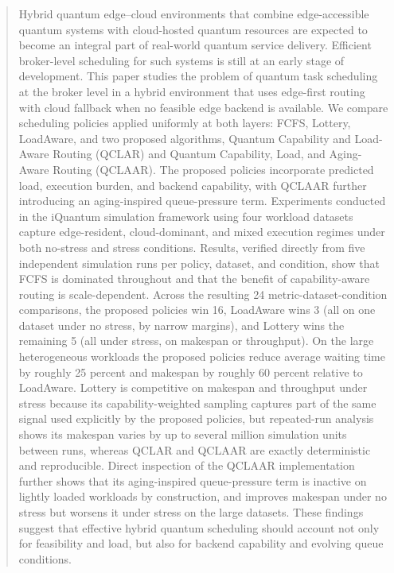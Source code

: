 \documentclass[preprint,12pt]{elsarticle}
\begin{document}
\begin{frontmatter}
\begin{abstract}
Hybrid quantum edge--cloud environments that combine edge-accessible quantum
systems with cloud-hosted quantum resources are expected to become an integral
part of real-world quantum service delivery. Efficient broker-level scheduling
for such systems is still at an early stage of development. This paper studies
the problem of quantum task scheduling at the broker level in a hybrid
environment that uses edge-first routing with cloud fallback when no feasible
edge backend is available. We compare scheduling policies applied uniformly at
both layers: FCFS, Lottery, LoadAware, and two proposed algorithms, Quantum
Capability and Load-Aware Routing (QCLAR) and Quantum Capability, Load, and
Aging-Aware Routing (QCLAAR). The proposed policies incorporate predicted load,
execution burden, and backend capability, with QCLAAR further introducing an
aging-inspired queue-pressure term. Experiments conducted in the iQuantum
simulation framework using four workload datasets capture edge-resident,
cloud-dominant, and mixed execution regimes under both no-stress and stress
conditions. Results, verified directly from five independent simulation runs
per policy, dataset, and condition, show that FCFS is dominated throughout and
that the benefit of capability-aware routing is scale-dependent. Across the
resulting 24 metric-dataset-condition comparisons, the proposed policies win 16,
LoadAware wins 3 (all on one dataset under no stress, by narrow margins), and
Lottery wins the remaining 5 (all under stress, on makespan or throughput). On
the large heterogeneous workloads the proposed policies reduce average waiting
time by roughly 25 percent and makespan by roughly 60 percent relative to
LoadAware. Lottery is competitive on makespan and throughput under stress
because its capability-weighted sampling captures part of the same signal used
explicitly by the proposed policies, but repeated-run analysis shows its
makespan varies by up to several million simulation units between runs, whereas
QCLAR and QCLAAR are exactly deterministic and reproducible. Direct inspection
of the QCLAAR implementation further shows that its aging-inspired queue-pressure
term is inactive on lightly loaded workloads by construction, and improves
makespan under no stress but worsens it under stress on the large datasets.
These findings
suggest that effective hybrid quantum scheduling should account not only for
feasibility and load, but also for backend capability and evolving queue
conditions.
\end{abstract}


\end{frontmatter}
\end{document}

